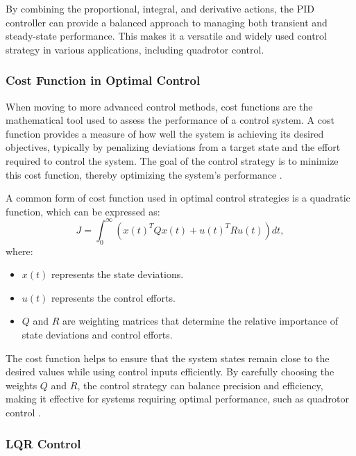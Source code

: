 \documentclass{UoNMCHA}
\numberwithin{equation}{section}
\begin{document}
By combining the proportional, integral, and derivative actions, the PID controller can provide a balanced approach to managing both transient and steady-state performance. This makes it a versatile and widely used control strategy in various applications, including quadrotor control.

\subsubsection{Cost Function in Optimal Control}

When moving to more advanced control methods, cost functions are the mathematical tool used to assess the performance of a control system. A cost function provides a measure of how well the system is achieving its desired objectives, typically by penalizing deviations from a target state and the effort required to control the system. The goal of the control strategy is to minimize this cost function, thereby optimizing the system's performance \cite{costFunctions}.

A common form of cost function used in optimal control strategies is a quadratic function, which can be expressed as:
\begin{equation}
\label{quadraticCostEq}
J = \int_{0}^{\infty} \left( x(t)^T Q x(t) + u(t)^T R u(t) \right) dt,
\end{equation}
where:
\begin{itemize}
    \item \( x(t) \) represents the state deviations.
    \item \( u(t) \) represents the control efforts.
    \item \( Q \) and \( R \) are weighting matrices that determine the relative importance of state deviations and control efforts.
\end{itemize}

The cost function helps to ensure that the system states remain close to the desired values while using control inputs efficiently. By carefully choosing the weights \( Q \) and \( R \), the control strategy can balance precision and efficiency, making it effective for systems requiring optimal performance, such as quadrotor control \cite{website:QuadraticCost}.





\subsubsection{LQR Control}
\end{document}
